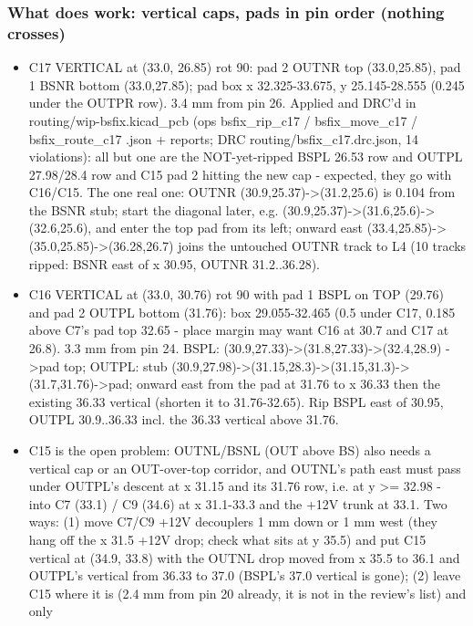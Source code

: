 \documentclass[11pt]{article}
\begin{document}
\subsubsection*{What does work: vertical caps, pads in pin order (nothing crosses)}
\begin{itemize}
\item C17 VERTICAL at (33.0, 26.85) rot 90: pad 2 OUTNR top (33.0,25.85), pad 1 BSNR bottom (33.0,27.85);
pad box x 32.325-33.675, y 25.145-28.555 (0.245 under the OUTPR row). 3.4 mm from pin 26.
Applied and DRC'd in routing/wip-bsfix.kicad\_pcb (ops bsfix\_rip\_c17 / bsfix\_move\_c17 /
bsfix\_route\_c17 .json + reports; DRC routing/bsfix\_c17.drc.json, 14 violations): all but one are
the NOT-yet-ripped BSPL 26.53 row and OUTPL 27.98/28.4 row and C15 pad 2 hitting the new cap -
expected, they go with C16/C15. The one real one: OUTNR (30.9,25.37)-\textgreater{}(31.2,25.6) is 0.104 from
the BSNR stub; start the diagonal later, e.g. (30.9,25.37)-\textgreater{}(31.6,25.6)-\textgreater{}(32.6,25.6), and enter the
top pad from its left; onward east (33.4,25.85)-\textgreater{}(35.0,25.85)-\textgreater{}(36.28,26.7) joins the untouched
OUTNR track to L4 (10 tracks ripped: BSNR east of x 30.95, OUTNR 31.2..36.28).
\item C16 VERTICAL at (33.0, 30.76) rot 90 with pad 1 BSPL on TOP (29.76) and pad 2 OUTPL bottom
(31.76): box 29.055-32.465 (0.5 under C17, 0.185 above C7's pad top 32.65 - place margin may want
C16 at 30.7 and C17 at 26.8). 3.3 mm from pin 24. BSPL: (30.9,27.33)-\textgreater{}(31.8,27.33)-\textgreater{}(32.4,28.9)
-\textgreater{}pad top; OUTPL: stub (30.9,27.98)-\textgreater{}(31.15,28.3)-\textgreater{}(31.15,31.3)-\textgreater{}(31.7,31.76)-\textgreater{}pad; onward east
from the pad at 31.76 to x 36.33 then the existing 36.33 vertical (shorten it to 31.76-32.65).
Rip BSPL east of 30.95, OUTPL 30.9..36.33 incl. the 36.33 vertical above 31.76.
\item C15 is the open problem: OUTNL/BSNL (OUT above BS) also needs a vertical cap or an OUT-over-top
corridor, and OUTNL's path east must pass under OUTPL's descent at x 31.15 and its 31.76 row,
i.e. at y \textgreater{}= 32.98 - into C7 (33.1) / C9 (34.6) at x 31.1-33.3 and the +12V trunk at 33.1. Two
ways: (1) move C7/C9 +12V decouplers 1 mm down or 1 mm west (they hang off the x 31.5 +12V
drop; check what sits at y 35.5) and put C15 vertical at (34.9, 33.8) with the OUTNL drop moved
from x 35.5 to 36.1 and OUTPL's vertical from 36.33 to 37.0 (BSPL's 37.0 vertical is gone);
(2) leave C15 where it is (2.4 mm from pin 20 already, it is not in the review's list) and only

\end{itemize}
\end{document}
